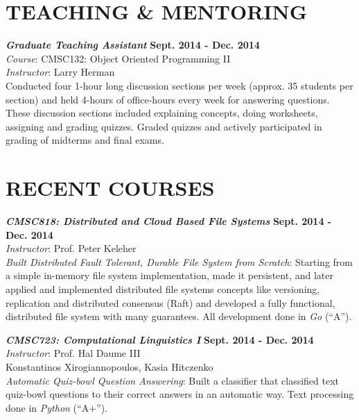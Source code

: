 \documentclass[margin, 10pt]{res} %
\begin{document}
\begin{resume}

\section{TEACHING \& MENTORING}

{\sl \textbf{Graduate Teaching Assistant}} \hfill \textbf{Sept. 2014 - Dec. 2014}\\
\textit{Course}: CMSC132: Object Oriented Programming II \\
\textit{Instructor}: Larry Herman\\
Conducted four 1-hour long discussion sections per week (approx. 35 students per section) and held 4-hours of office-hours every week for answering questions. These discussion sections included explaining concepts, doing worksheets, assigning and grading quizzes. Graded quizzes and actively participated in grading of midterms and final exams.


\section{RECENT COURSES}

{\sl \textbf{CMSC818: Distributed and Cloud Based File Systems}} \hfill \textbf{Sept. 2014 - Dec. 2014}\\
\textit{Instructor}: Prof. Peter Keleher\\
\textit{Built Distributed Fault Tolerant, Durable File System from Scratch}: Starting from a simple in-memory file system implementation, made it persistent, and later applied and implemented distributed file systems concepts like versioning, replication and distributed consensus (Raft) and developed a fully functional, distributed file system with many guarantees. All development done in \textit{Go} (``A'').

{\sl \textbf{CMSC723: Computational Linguistics I}} \hfill \textbf{Sept. 2014 - Dec. 2014}\\
\textit{Instructor}: Prof. Hal Daume III\\
Konstantinos Xirogiannopoulos, Kasia Hitczenko\\
\textit{Automatic Quiz-bowl Question Answering}: Built a classifier that classified text quiz-bowl questions to their correct answers in an automatic way. Text processing done in \textit{Python} (``A+'').


\end{resume}
\end{document}
